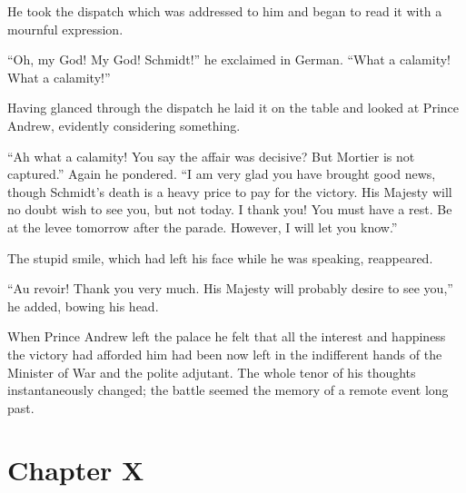 He took the dispatch which was addressed to him and began to read
it with a mournful expression.

``Oh, my God! My God! Schmidt!'' he exclaimed in German. ``What a
calamity!  What a calamity!''

Having glanced through the dispatch he laid it on the table and
looked at Prince Andrew, evidently considering something.

``Ah what a calamity! You say the affair was decisive? But
Mortier is not captured.'' Again he pondered. ``I am very glad
you have brought good news, though Schmidt's death is a heavy
price to pay for the victory.  His Majesty will no doubt wish to
see you, but not today. I thank you!  You must have a rest. Be at
the levee tomorrow after the parade.  However, I will let you
know.''

The stupid smile, which had left his face while he was speaking,
reappeared.

``Au revoir! Thank you very much. His Majesty will probably
desire to see you,'' he added, bowing his head.

When Prince Andrew left the palace he felt that all the interest
and happiness the victory had afforded him had been now left in
the indifferent hands of the Minister of War and the polite
adjutant. The whole tenor of his thoughts instantaneously
changed; the battle seemed the memory of a remote event long
past.


\chapter*{Chapter X}
\ifaudio     {} \fi

